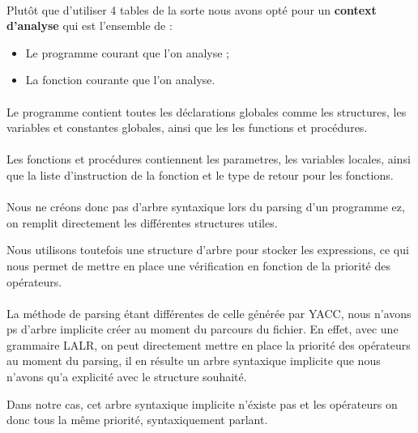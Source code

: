 \paragraph{}Plutôt que d'utiliser 4 tables de la sorte nous avons opté pour 
un \textbf{context d'analyse} qui est l'ensemble de :
\begin{itemize}
    \item Le programme courant que l'on analyse ;
    \item La fonction courante que l'on analyse.
\end{itemize}

\paragraph{}Le programme contient toutes les déclarations globales comme les 
structures, les variables et constantes globales, ainsi que les les functions 
et procédures.

\paragraph{}Les fonctions et procédures contiennent les parametres, les 
variables locales, ainsi que la liste d'instruction de la fonction et le type 
de retour pour les fonctions.

\paragraph{}Nous ne créons donc pas d'arbre syntaxique lors du parsing d'un 
programme ez, on remplit directement les différentes structures utiles. 

Nous utilisons toutefois une structure d'arbre pour stocker les expressions, 
ce qui nous permet de mettre en place une vérification en fonction de la 
priorité des opérateurs.

\paragraph{} La méthode de parsing étant différentes de celle générée par YACC, 
nous n'avons ps d'arbre implicite créer au moment du parcours du fichier. En 
effet, avec une grammaire LALR, on peut directement mettre en place la priorité 
des opérateurs au moment du parsing, il en résulte un arbre syntaxique 
implicite que nous n'avons qu'a explicité avec le structure souhaité.

Dans notre cas, cet arbre syntaxique implicite n'éxiste pas et les opérateurs 
on donc tous la même priorité, syntaxiquement parlant.

